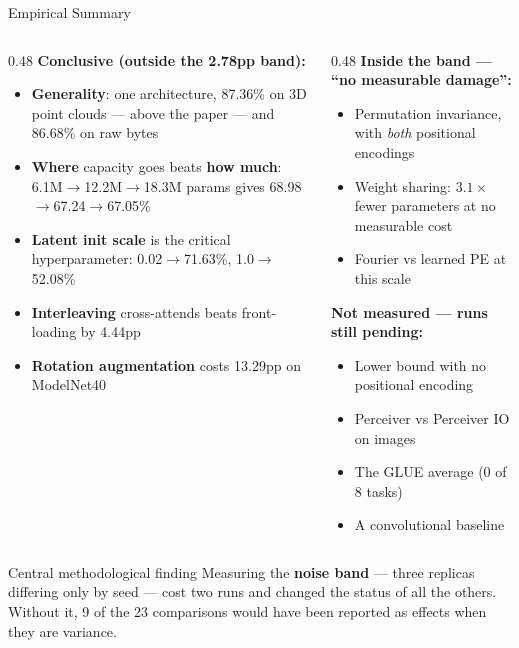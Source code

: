 \documentclass[aspectratio=169,11pt]{beamer}
\begin{document}
\begin{frame}[shrink=5]{Empirical Summary}
  \begin{columns}[T]
    \begin{column}{0.48\textwidth}
      \textbf{Conclusive (outside the 2.78pp band):}
      \begin{itemize}\small
        \item \textbf{Generality}: one architecture, 87.36\% on 3D point clouds --- above the paper --- and 86.68\% on raw bytes
        \item \textbf{Where} capacity goes beats \textbf{how much}: 6.1M$\to$12.2M$\to$18.3M params gives 68.98$\to$67.24$\to$67.05\%
        \item \textbf{Latent init scale} is the critical hyperparameter: 0.02$\to$71.63\%, 1.0$\to$52.08\%
        \item \textbf{Interleaving} cross-attends beats front-loading by 4.44pp
        \item \textbf{Rotation augmentation} costs 13.29pp on ModelNet40
      \end{itemize}
    \end{column}
    \begin{column}{0.48\textwidth}
      \textbf{Inside the band --- ``no measurable damage'':}
      \begin{itemize}\small
        \item Permutation invariance, with \emph{both} positional encodings
        \item Weight sharing: $3.1\times$ fewer parameters at no measurable cost
        \item Fourier vs learned PE at this scale
      \end{itemize}

      \vspace{0.4em}
      \textbf{Not measured --- runs still pending:}
      \begin{itemize}\small
        \item Lower bound with no positional encoding
        \item Perceiver vs Perceiver IO on images
        \item The GLUE average (0 of 8 tasks)
        \item A convolutional baseline
      \end{itemize}
    \end{column}
  \end{columns}

  \vspace{0.5em}
  \begin{block}{Central methodological finding}
    Measuring the \textbf{noise band} --- three replicas differing only by seed --- cost two runs and changed the status of all the others. Without it, 9 of the 23 comparisons would have been reported as effects when they are variance.
  \end{block}
\end{frame}
\end{document}
